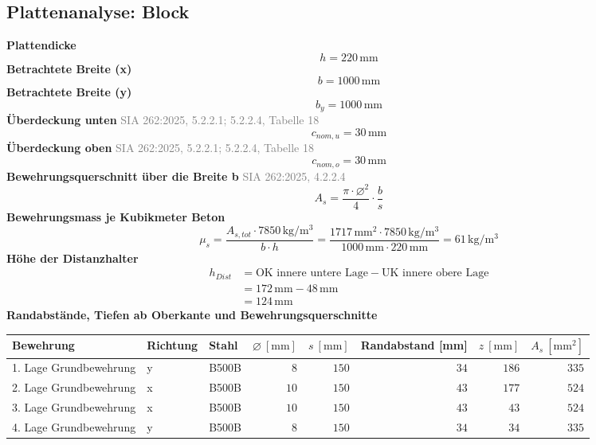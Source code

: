 \documentclass[11pt,a4paper]{article}
\newcommand{\normref}[1]{{\small\textcolor{gray}{#1}}}
\begin{document}
\subsection{Plattenanalyse: Block}
\noindent\textbf{Plattendicke}
\begin{equation*}
h = 220\,\mathrm{mm}
\end{equation*}
\noindent\textbf{Betrachtete Breite (x)}
\begin{equation*}
b = 1000\,\mathrm{mm}
\end{equation*}
\noindent\textbf{Betrachtete Breite (y)}
\begin{equation*}
b_y = 1000\,\mathrm{mm}
\end{equation*}
\noindent\textbf{Überdeckung unten} \hfill \normref{SIA 262:2025, 5.2.2.1; 5.2.2.4, Tabelle 18}
\begin{equation*}
c_{nom,u} = 30\,\mathrm{mm}
\end{equation*}
\noindent\textbf{Überdeckung oben} \hfill \normref{SIA 262:2025, 5.2.2.1; 5.2.2.4, Tabelle 18}
\begin{equation*}
c_{nom,o} = 30\,\mathrm{mm}
\end{equation*}
\noindent\textbf{Bewehrungsquerschnitt über die Breite b} \hfill \normref{SIA 262:2025, 4.2.2.4}
\begin{equation*}
A_s = \frac{\pi \cdot \varnothing^{2}}{4} \cdot \frac{b}{s}
\end{equation*}
\noindent\textbf{Bewehrungsmass je Kubikmeter Beton}
\begin{equation*}
\mu_s = \frac{A_{s,tot} \cdot 7850\,\mathrm{kg}/\mathrm{m}^{3}}{b \cdot h} = \frac{1717\,\mathrm{mm}^{2} \cdot 7850\,\mathrm{kg}/\mathrm{m}^{3}}{1000\,\mathrm{mm} \cdot 220\,\mathrm{mm}} = 61\,\mathrm{kg}/\mathrm{m}^{3}
\end{equation*}
\noindent\textbf{Höhe der Distanzhalter}
\begin{equation*}
\begin{aligned}
  h_{Dist} &= \text{OK innere untere Lage} - \text{UK innere obere Lage} \\
  &= 172\,\mathrm{mm} - 48\,\mathrm{mm} \\
  &= 124\,\mathrm{mm}
\end{aligned}
\end{equation*}
\noindent\textbf{Randabstände, Tiefen ab Oberkante und Bewehrungsquerschnitte}
\begin{longtable}{lllrrrrr}
\hline
Bewehrung & Richtung & Stahl & $\varnothing\ [\mathrm{mm}]$ & $s\ [\mathrm{mm}]$ & Randabstand [mm] & $z\ [\mathrm{mm}]$ & $A_s\ [\mathrm{mm}^2]$ \\
\hline
\endhead
1. Lage Grundbewehrung & y & B500B & $8$ & $150$ & $34$ & $186$ & $335$ \\
2. Lage Grundbewehrung & x & B500B & $10$ & $150$ & $43$ & $177$ & $524$ \\
3. Lage Grundbewehrung & x & B500B & $10$ & $150$ & $43$ & $43$ & $524$ \\
4. Lage Grundbewehrung & y & B500B & $8$ & $150$ & $34$ & $34$ & $335$ \\
\hline
\end{longtable}
\end{document}
